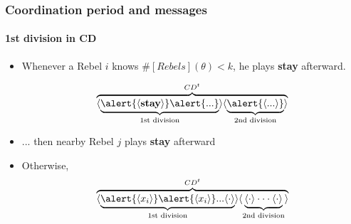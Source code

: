 \documentclass[9pt]{beamer}
\begin{document}
\begin{frame}
\frametitle{Coordination period and messages}


\framesubtitle{1st division in CD}



\begin{itemize}
\item Whenever a Rebel $i$ knows \alert{$\#[Rebels](\theta)<k$}, he plays \textbf{stay} afterward.

\[\overbrace{\langle\underbrace{\alert{\langle \textbf{stay} \rangle}  \alert{...} }_{\text{1st division}}\rangle \langle\underbrace{\alert{\langle ... \rangle}}_{\text{2nd division}} \rangle }^{CD^t}\] 

\pause

\item ... then nearby Rebel $j$ {plays \textbf{stay} afterward}

\pause

\item Otherwise, \[\overbrace{\langle\underbrace{\alert{\langle x_i \rangle} \alert{\langle x_i \rangle} ... \langle \cdot \rangle}_{\text{1st division}}\rangle \langle\underbrace{\langle \cdot \rangle \cdot \cdot \cdot \langle \cdot \rangle}_{\text{2nd division}} \rangle }^{CD^t}\] 
\end{itemize}

\end{frame}
\end{document}
